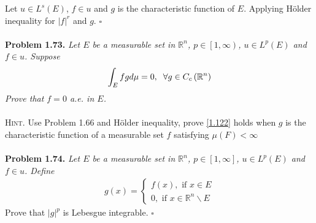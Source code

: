 \documentclass[a4paper]{article}
\numberwithin{equation}{section}
\begin{document}
Let $u\in L^s\left(E\right)$, $f\in u$ and $g$ is the characteristic function of $E$. Applying H\"{o}lder inequality for ${\left| f \right|^r}$ and $g$. \hfill $\square$\\
\\
\textbf{Problem 1.73.} \textit{Let $E$ be a measurable set in $\mathbb{R}^n$, $p\in \left[1,\infty\right)$, $u\in L^p\left(E\right)$ and $f\in u$. Suppose}
\begin{align}
\label{1.122}
\int_E {fgd\mu }  = 0,\hspace{0.2cm}\forall g \in {C_c}\left( {{\mathbb{R}^n}} \right)
\end{align}
\textit{Prove that $f=0$ a.e. in $E$.}\\
\\
\textsc{Hint.} Use Problem 1.66 and H\"{o}lder inequality, prove \eqref{1.122} holds when $g$ is the characteristic function of a measurable set $f$ satisfying $\mu\left(F\right)<\infty$\\
\\
\textbf{Problem 1.74.} \textit{Let $E$ be a measurable set in $\mathbb{R}^n$, $p\in \left[1,\infty\right]$, $u\in L^p\left(E\right)$ and $f\in u$. Define}
\begin{align}
g\left( x \right) = \left\{ {\begin{array}{*{20}{c}}
{f\left( x \right),\mbox{ if }x \in E}\\
{0,\mbox{ if }x \in {\mathbb{R}^n}\backslash E}
\end{array}} \right.
\end{align}
Prove that ${\left| g \right|^p}$ is Lebesgue integrable. \hfill $\square$
\end{document}
